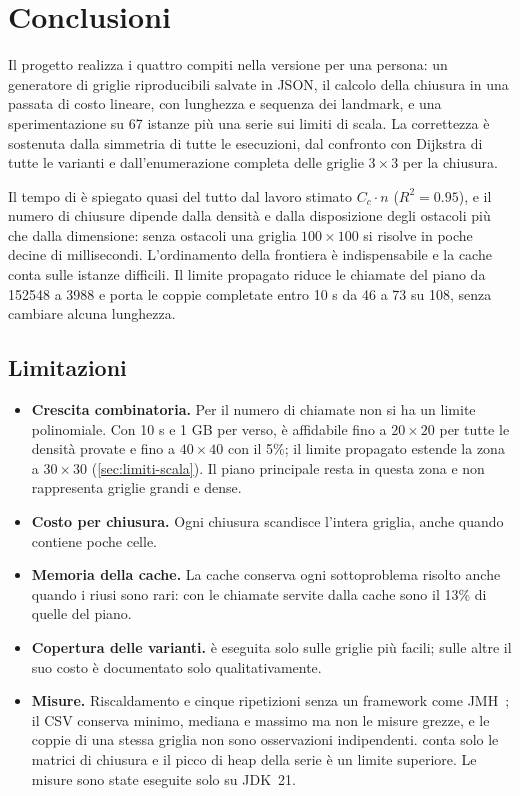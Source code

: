 \section{Conclusioni}
\label{sec:conclusioni}

Il progetto realizza i quattro compiti nella versione per una persona: un
generatore di griglie riproducibili salvate in JSON, il calcolo della
chiusura in una passata di costo lineare, \cmin{} con lunghezza e sequenza
dei landmark, e una sperimentazione su 67 istanze più una serie sui limiti di
scala. La correttezza è sostenuta dalla simmetria di tutte le esecuzioni, dal
confronto con Dijkstra di tutte le varianti e dall'enumerazione completa
delle griglie $3\times3$ per la chiusura.

Il tempo di \cmin{} è spiegato quasi del tutto dal lavoro stimato $C_c \cdot
n$ ($R^2 = \num{0.95}$), e il numero di chiusure dipende dalla densità e
dalla disposizione degli ostacoli più che dalla dimensione: senza ostacoli
una griglia $100\times100$ si risolve in poche decine di millisecondi.
L'ordinamento della frontiera è indispensabile e la cache conta sulle
istanze difficili. Il limite propagato riduce le chiamate del piano da
\num{152548} a \num{3988} e porta le coppie completate entro 10 s da 46 a 73
su 108, senza cambiare alcuna lunghezza.

\subsection{Limitazioni}

\begin{itemize}
  \item \textbf{Crescita combinatoria.} Per il numero di chiamate non si ha
        un limite polinomiale. Con 10 s e 1 GB per verso,  è
        affidabile fino a $20\times20$ per tutte le densità provate e fino a
        $40\times40$ con il 5\%; il limite propagato estende la zona a
        $30\times30$ (\cref{sec:limiti-scala}). Il piano principale resta in
        questa zona e non rappresenta griglie grandi e dense.
  \item \textbf{Costo per chiusura.} Ogni chiusura scandisce l'intera
        griglia, anche quando contiene poche celle.
  \item \textbf{Memoria della cache.} La cache conserva ogni sottoproblema
        risolto anche quando i riusi sono rari: con  le chiamate
        servite dalla cache sono il 13\% di quelle del piano.
  \item \textbf{Copertura delle varianti.}  è
        eseguita solo sulle griglie più facili; sulle altre il suo costo è
        documentato solo qualitativamente.
  \item \textbf{Misure.} Riscaldamento e cinque ripetizioni senza un
        framework come JMH~\cite{jmh}; il CSV conserva minimo, mediana e
        massimo ma non le misure grezze, e le coppie di una stessa griglia non
        sono osservazioni indipendenti.  conta solo le matrici di
        chiusura e il picco di heap della serie è un limite superiore. Le
        misure sono state eseguite solo su JDK~21.
\end{itemize}

